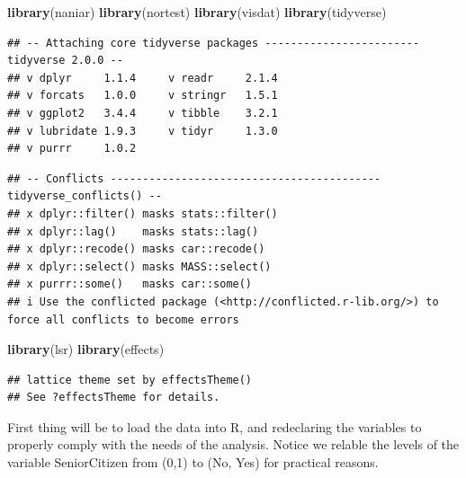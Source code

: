 \documentclass[
]{article}
\newenvironment{Shaded}{\begin{snugshade}}{\end{snugshade}}
\newcommand{\FunctionTok}[1]{\textcolor[rgb]{0.13,0.29,0.53}{\textbf{#1}}}
\newcommand{\NormalTok}[1]{#1}
\begin{document}
\begin{Shaded}
\begin{Highlighting}[]
\FunctionTok{library}\NormalTok{(naniar)}
\FunctionTok{library}\NormalTok{(nortest)}
\FunctionTok{library}\NormalTok{(visdat)}
\FunctionTok{library}\NormalTok{(tidyverse)}
\end{Highlighting}
\end{Shaded}

\begin{verbatim}
## -- Attaching core tidyverse packages ------------------------ tidyverse 2.0.0 --
## v dplyr     1.1.4     v readr     2.1.4
## v forcats   1.0.0     v stringr   1.5.1
## v ggplot2   3.4.4     v tibble    3.2.1
## v lubridate 1.9.3     v tidyr     1.3.0
## v purrr     1.0.2
\end{verbatim}

\begin{verbatim}
## -- Conflicts ------------------------------------------ tidyverse_conflicts() --
## x dplyr::filter() masks stats::filter()
## x dplyr::lag()    masks stats::lag()
## x dplyr::recode() masks car::recode()
## x dplyr::select() masks MASS::select()
## x purrr::some()   masks car::some()
## i Use the conflicted package (<http://conflicted.r-lib.org/>) to force all conflicts to become errors
\end{verbatim}

\begin{Shaded}
\begin{Highlighting}[]
\FunctionTok{library}\NormalTok{(lsr)}
\FunctionTok{library}\NormalTok{(effects)}
\end{Highlighting}
\end{Shaded}

\begin{verbatim}
## lattice theme set by effectsTheme()
## See ?effectsTheme for details.
\end{verbatim}

First thing will be to load the data into R, and redeclaring the
variables to properly comply with the needs of the analysis. Notice we
relable the levels of the variable SeniorCitizen from (0,1) to (No, Yes)
for practical reasons.
\end{document}
